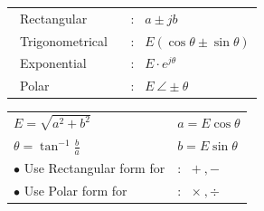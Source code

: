 \documentclass[12pt]{article}
\begin{document}
\vspace{3ex}
\begin{minipage}[t]{0.4\textwidth}
   \begin{tabular}{ll|}
      \ Rectangular \ &: \ \large{${a} \pm j{b}$} \\
      \ Trigonometrical \ &: \ \large{${E}(\cos{{\theta}} \pm \sin{{\theta}})$} \\
      \ Exponential \ &: \ \large{${E} \cdot e^{j{\theta}}$} \\
      \ Polar \ &: \ \large{${E} \ \angle \pm {\theta} $} \\
   \end{tabular}
\end{minipage}
\hfill
\begin{minipage}[t]{0.56\textwidth}
   \vspace{-2\baselineskip}
   \begin{tabular}{ll}
      \large{$E=\sqrt{a^2+b^2}$} & \large{$a = E \cos{\theta}$}\\[0.8ex]
      \large{$\theta = \tan^{-1}{\frac{b}{a}}$} & \large{$b = E \sin{\theta}$}\\[0.8ex]
      $\bullet$ Use Rectangular form for &: \ $+\ , -$ \\
      $\bullet$ Use Polar form for &: \ $\times \ , \div$
   \end{tabular}
\end{minipage}



\vspace{5ex}
\end{document}

